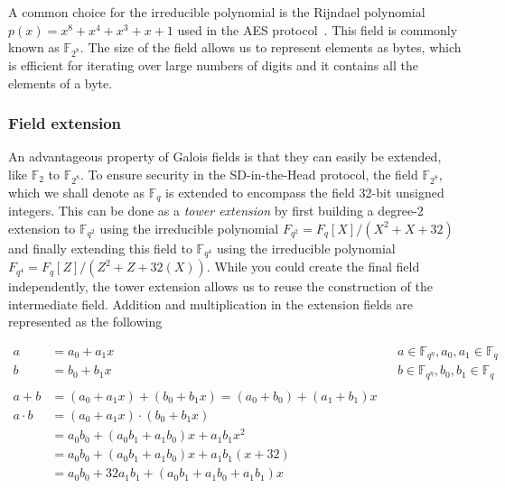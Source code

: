\documentclass[11pt]{report}
\theoremstyle{definition}
\theoremstyle{plain}
\begin{document}
A common choice for the irreducible polynomial is the Rijndael polynomial $p(x) = x^8 + x^4 + x^3 + x + 1$ used in the AES protocol~\cite{brownadvanced}. This field is commonly known as $\mathbb{F}_{2^8}$. The size of the field allows us to represent elements as bytes, which is efficient for iterating over large numbers of digits and it contains all the elements of a byte.

\subsubsection{Field extension}\label{sub:field_extension}

An advantageous property of Galois fields is that they can easily be extended, like $\mathbb{F}_{2}$ to $\mathbb{F}_{2^8}$. To ensure security in the SD-in-the-Head protocol, the field $\mathbb{F}_{2^8}$, which we shall denote as $\mathbb{F}_q$ is extended to encompass the field 32-bit unsigned integers. This can be done as a \textit{tower extension} by first building a degree-2 extension to $\mathbb{F}_{q^2}$ using the irreducible polynomial $F_{q^2} = F_q[X] / (X^2 + X + 32)$ and finally extending this field to $\mathbb{F}_{q^4}$ using the irreducible polynomial $F_{q^4} = F_q[Z] / (Z^2 + Z + 32(X))$. While you could create the final field independently, the tower extension allows us to reuse the construction of the intermediate field. Addition and multiplication in the extension fields are represented as the following

\begin{align*}
  a         & = a_0 + a_1x                                               &  & a \in \mathbb{F}_{q^\eta}, a_0, a_1 \in \mathbb{F}_q \\
  b         & = b_0 + b_1x                                               &  & b \in \mathbb{F}_{q^\eta}, b_0, b_1 \in \mathbb{F}_q \\\\
  a + b     & = (a_0 + a_1x) + (b_0 + b_1x) = (a_0 + b_0) + (a_1 + b_1)x                                                           \\
  a \cdot b & = (a_0 + a_1x) \cdot (b_0 + b_1x)                                                                                    \\
            & = a_0b_0 + (a_0b_1 + a_1b_0)x + a_1b_1x^2                                                                            \\
            & = a_0b_0 + (a_0b_1 + a_1b_0)x + a_1b_1(x + 32)                                                                       \\
            & = a_0b_0 + 32a_1b_1 + (a_0b_1 + a_1b_0 + a_1b_1)x
\end{align*}
\end{document}
